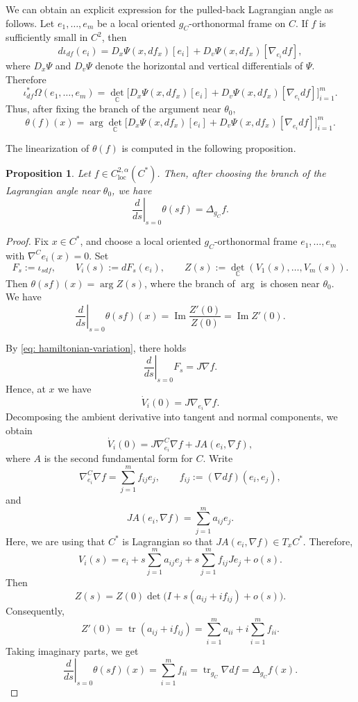 \documentclass[11pt]{amsart}
\newtheorem{proposition}{Proposition}
\theoremstyle{definition}
\theoremstyle{remark}
\newcommand{\C}{\mathbb{C}}
\begin{document}
We can obtain an explicit expression for the pulled-back Lagrangian angle as follows.
Let
\(e_1,\ldots,e_m\) be a local oriented \(g_C\)-orthonormal frame on \(C\). If
\(f\) is sufficiently small in \(C^2\), then
\[
    d\iota_{df}(e_i)
    =
    D_x\Psi(x,df_x)[e_i]
    +
    D_v\Psi(x,df_x)[\nabla_{e_i}df],
\]
where \(D_x\Psi\) and \(D_v\Psi\) denote the horizontal and vertical
differentials of \(\Psi\). Therefore
\[
    \iota_{df}^*\Omega(e_1,\ldots,e_m)
    =
    {\det}_{\C}\Big[
    D_x\Psi(x,df_x)[e_i]
    +
    D_v\Psi(x,df_x)[\nabla_{e_i}df]
    \Big]_{i=1}^m .
\]
Thus, after fixing the branch of the argument near \(\theta_0\), 
\[
    \theta(f)(x)
    =
    \operatorname{arg}
    {\det}_{\C}\Big[
    D_x\Psi(x,df_x)[e_i]
    +
    D_v\Psi(x,df_x)[\nabla_{e_i}df]
    \Big]_{i=1}^m.
\]

The linearization of $\theta(f)$ is computed in the following proposition.
\begin{proposition}\label{prop: linearization} 
    Let \(f\in C^{2,\alpha}_{\mathrm{loc}}(C^\ast)\). Then, after choosing the
branch of the Lagrangian angle near \(\theta_0\), we have
\[
    \left.\frac{d}{ds}\right|_{s=0}\theta(sf)
    =
    \Delta_{g_C}f .
\]
\end{proposition}
\begin{proof}
Fix \(x\in C^\ast\), and choose a local oriented \(g_C\)-orthonormal frame
\(e_1,\ldots,e_m\) with \(\nabla^C e_i(x)=0\). Set
\[
    F_s:=\iota_{sdf},
    \qquad
    V_i(s):=dF_s(e_i),
    \qquad
    Z(s):={\det}_\C(V_1(s),\ldots,V_m(s)).
\]
Then $\theta(sf)(x)=\operatorname{arg} Z(s)$,
where the branch of \(\operatorname{arg}\) is chosen near \(\theta_0\).\\
We have
\[
    \left.\frac{d}{ds}\right|_{s=0}\theta(sf)(x)
    =
    \operatorname{Im}\frac{Z'(0)}{Z(0)}=\operatorname{Im} Z'(0).
\]

By \eqref{eq: hamiltonian-variation}, there holds
\[
    \left.\frac{d}{ds}\right|_{s=0}F_s
    =
    J\nabla f.
\]
Hence, at \(x\) we have
\[
    \dot V_i(0)
    =
    J\nabla_{e_i}\nabla f .
\]
Decomposing the ambient derivative into tangent and normal components, we obtain
\[
    \dot V_i(0)
    =
    J\nabla^C_{e_i}\nabla f
    +
    JA(e_i,\nabla f),
\]
where $A$ is the second fundamental form for $C$. Write
\[
    \nabla^C_{e_i}\nabla f
    =
    \sum_{j=1}^m f_{ij}e_j,
    \qquad
    f_{ij}:=(\nabla df)(e_i,e_j),
\]
and
\[
    JA(e_i,\nabla f)
    =
    \sum_{j=1}^m a_{ij}e_j .
\]
Here, we are using that \(C^\ast\) is Lagrangian so that
\(JA(e_i,\nabla f)\in T_xC^\ast\). Therefore,
\[
    V_i(s)
    =
    e_i
    +
    s\sum_{j=1}^m a_{ij}e_j
    +
    s\sum_{j=1}^m f_{ij}Je_j
    +
    o(s).
\]
Then
\[
    Z(s)
    =
    Z(0)\det\big(I+s(a_{ij}+i f_{ij})+o(s)\big).
\]
Consequently,
\[
    Z'(0)
    =
    \operatorname{tr}(a_{ij}+i f_{ij})
    =
    \sum_{i=1}^m a_{ii}
    +
    i\sum_{i=1}^m f_{ii}.
\]
Taking imaginary parts, we get
\[
    \left.\frac{d}{ds}\right|_{s=0}\theta(sf)(x)
    =
    \sum_{i=1}^m f_{ii}
    =
    \operatorname{tr}_{g_C}\nabla df
    =
    \Delta_{g_C}f(x).
\]
\end{proof}
\end{document}

